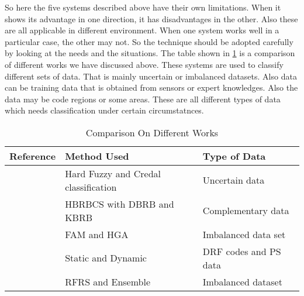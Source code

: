 \documentclass[10pt,a4paper,journal]{IEEEtran}
\begin{document}
\hspace{1cm}So here the five systems described above have their own limitations. When it shows its advantage in one direction, it has disadvantages in the other. Also these are all applicable in different environment. When one system works well in a particular case, the other may not. So the technique should be adopted carefully by looking at the needs and the situations. The table shown in \ref{1} is a comparison of different works we have discussed above. These systems are used to classify different sets of data. That is mainly uncertain or imbalanced datasets. Also data can be   training data that is obtained from sensors or expert knowledges. Also the data may be code regions or some areas. These are all different types of data which needs classification under certain circumstatnces.   
\begin{table}
\begin{center}
\caption{Comparison On Different Works}
\label{1}
\begin{tabular}{|l|l|l|}
\hline 
\textbf{Reference} & \textbf{Method Used} & \textbf{Type of Data}\\ 
\hline 
[1] & Hard Fuzzy and Credal classification & Uncertain data\\ 
\hline
[9] & HBRBCS with DBRB and KBRB & Complementary data\\ 
\hline 
[4] & FAM and HGA  & Imbalanced data set\\ 
\hline 
[10] & Static and Dynamic & DRF codes and PS data\\ 
\hline 
[14] & RFRS and Ensemble & Imbalanced dataset\\ 
\hline 
\end{tabular} 
\end{center}
\end{table}





\newpage
\end{document}

